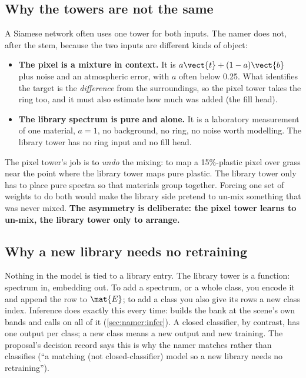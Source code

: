 \subsection{Why the towers are not the same}

A Siamese network often uses one tower for both inputs. The namer does not, after the stem, because the two inputs
are different kinds of object:
\begin{itemize}
\item \textbf{The pixel is a mixture in context.} It is $a\vect{t}+(1-a)\vect{b}$ plus noise and an atmospheric
error, with $a$ often below 0.25. What identifies the target is the \emph{difference} from the surroundings, so the
pixel tower takes the ring too, and it must also estimate how much was added (the fill head).
\item \textbf{The library spectrum is pure and alone.} It is a laboratory measurement of one material, $a=1$, no
background, no ring, no noise worth modelling. The library tower has no ring input and no fill head.
\end{itemize}
The pixel tower's job is to \emph{undo} the mixing: to map a 15\%-plastic pixel over grass near the point where the
library tower maps pure plastic. The library tower only has to place pure spectra so that materials group together.
Forcing one set of weights to do both would make the library side pretend to un-mix something that was never mixed.
\textbf{The asymmetry is deliberate: the pixel tower learns to un-mix, the library tower only to arrange.}

\subsection{Why a new library needs no retraining}

Nothing in the model is tied to a library entry. The library tower is a function: spectrum in, embedding out. To add
a spectrum, or a whole class, you encode it and append the row to $\mat{E}$; to add a class you also give its rows a
new class index. Inference does exactly this every time:  builds the bank at the scene's own bands
and calls  on all of it (\cref{sec:namer:infer}). A closed classifier, by contrast, has one
output per class; a new class means a new output and new training. The proposal's decision record says this is why
the namer matches rather than classifies (``a matching (not closed-classifier) model so a new library needs no
retraining'').

